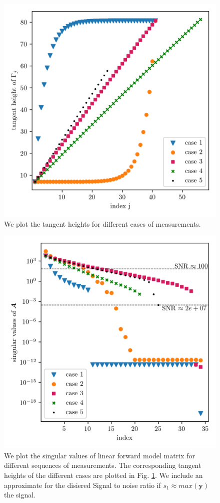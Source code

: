 \begin{figure}[ht!]
	\centering
	\includegraphics{MeasTangHeight.png}
	\caption[Tangent heights for different sequence of measurements.]{We plot the tangent heights for different cases of measurements.}
	\label{fig:TangHCases}
\end{figure}
\begin{figure}[ht!]
	\centering
	\includegraphics{SingValA.png}
	\caption[Singular values of linear forward model matrix for different sequences of measurements.]{We plot the singular values of linear forward model matrix for different sequences of measurements.
		The corresponding tangent heights of the different cases are plotted in Fig. \ref{fig:TangHCases}. We include an approximate for the disiered Signal to noise ratio if $s_1 \approx max(\bm{y}) $ the signal.}
	\label{fig:SingA}
\end{figure}
